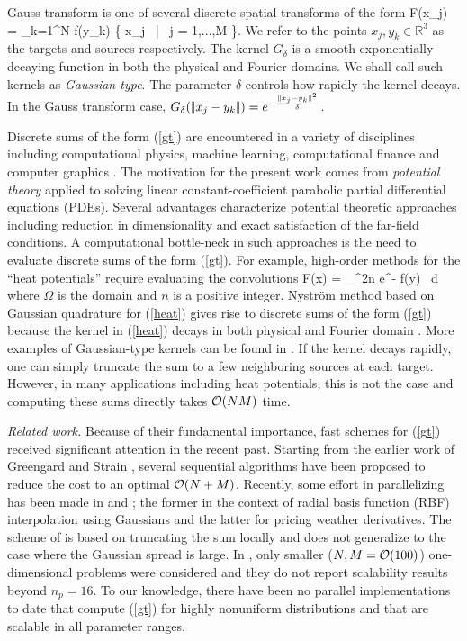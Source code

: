 
Gauss transform is one of several discrete spatial transforms of the form 
%
\beq F(x_j) = \sum_{k=1}^N  f(y_k) \quad {} \quad \{ x_j \, | \, j = 1,...,M \}.  \label{gt} \eeq
%
We refer to the points $ x_j, y_k \in \mathbb{R}^3 $ as the targets and sources respectively. The kernel $G_\delta$ is a
 smooth exponentially decaying function in both the physical and Fourier domains. We shall call such kernels as {\em Gaussian-type}.
  The parameter $\delta$ controls how rapidly the kernel decays.  In the Gauss transform case, $G_\delta (|\!| x_j - y_k |\!|) = e^{-\frac{|\!| x_j - y_k |\!|^2}{\delta}}$. 

Discrete sums of the form (\ref{gt}) are encountered in a variety of disciplines including computational physics,
 machine learning, computational finance and computer graphics \cite{strain94adap, elgammal03, broadie03, kim05, veerapaneni08}. The
 motivation for the present work comes from {\em potential theory} \cite{kress99} applied to  solving linear constant-coefficient
 parabolic partial differential equations (PDEs). Several advantages characterize potential theoretic approaches including reduction
 in dimensionality and exact satisfaction of the far-field conditions. A computational bottle-neck in such approaches is the need to 
 evaluate discrete sums of the form (\ref{gt}). For example, high-order methods for the ``heat potentials'' require evaluating the convolutions \cite{li09, skv09}
% 
\beq F(x) = \int_\Omega {}^{2n} e^{-} f(y) \, d\Omega \label{heat} \eeq
% 
where $\Omega$ is the domain and $n$ is a positive integer. Nystr\"{o}m method based on Gaussian quadrature for (\ref{heat}) 
gives rise to discrete sums of the form (\ref{gt}) because the kernel in (\ref{heat}) decays in both physical and Fourier 
domain \cite{fggt}. More examples of Gaussian-type kernels can be found in \cite{victor03}. If the kernel decays rapidly, one 
can simply truncate the sum to a few neighboring sources at each target. However, in many applications including heat potentials, this
 is not the case and computing these sums directly takes $\mathcal{O}(NM)$ time. 


{\em Related work.} Because of their fundamental importance, fast schemes for (\ref{gt}) received significant attention in 
the recent past. Starting from the earlier work of Greengard and Strain \cite{fgt}, several sequential
 algorithms \cite{greengard98, sun02, duraiswami03, tausch09, fggt} have been proposed to reduce the cost to an optimal $\mathcal{O}(N+M)$. Recently,
  some effort in parallelizing has been made in \cite{rio09} and \cite{yusaku06}; the former in the context of radial basis 
  function (RBF) interpolation using Gaussians and the latter for pricing weather derivatives. The scheme of \cite{rio09} is based on 
  truncating the sum locally and does not generalize to the case where the Gaussian spread is large. In \cite{yusaku06}, only
   smaller ($N, M = \mathcal{O}(100)$) one-dimensional problems were considered and they do not report scalability results beyond $n_p = 16$. 
To our knowledge, there have been no parallel implementations to date that compute (\ref{gt}) for highly nonuniform
 distributions and that are scalable in all parameter ranges. 

